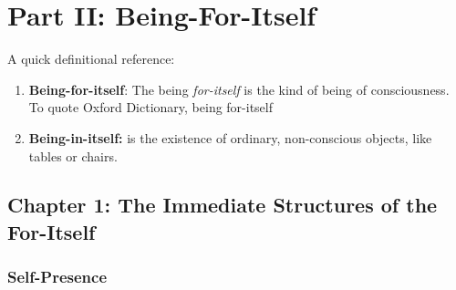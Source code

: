 \chapter{Part II: Being-For-Itself}

A quick definitional reference:

\begin{enumerate}
  \item \textbf{Being-for-itself}: The being \emph{for-itself} is the kind of being of consciousness. To quote Oxford Dictionary, being for-itself 
  \item \textbf{Being-in-itself:} is the existence of ordinary, non-conscious objects, like tables or chairs.
\end{enumerate}

\section{Chapter 1: The Immediate Structures of the For-Itself}

\subsection{Self-Presence}

